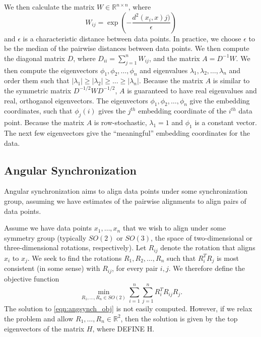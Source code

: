 \documentclass[10pt]{article}
\begin{document}
We then calculate the matrix $W \in \mathbb{R}^{n \times n}$, where 
\begin{equation}
W_{ij} = \exp \left( -\frac{d^2(x_i, x)j)}{\epsilon} \right)
\end{equation}
and $\epsilon$ is a characteristic distance between data points.
%
In practice, we choose $\epsilon$ to be the median of the pairwise distances between data points.
%
We then compute the diagonal matrix $D$, where $D_{ii} = \sum_{j=1}^{n} W_{ij}$, and the matrix $A = D^{-1} W$. 
%
We then compute the eigenvectors $\phi_1, \phi_2, \dots, \phi_n$ and eigenvalues $\lambda_1, \lambda_2, \dots, \lambda_n$ and order them such that $|\lambda_1| \ge |\lambda_2| \ge \dots \ge |\lambda_n|$. 
%
Because the matrix $A$ is similar to the symmetric matrix $D^{-1/2} W D^{-1/2}$, $A$ is guaranteed to have real eigenvalues and real, orthoganol eigenvectors. 
%
The eigenvectors $\phi_1, \phi_2, \dots, \phi_n$ give the embedding coordinates, such that $\phi_j(i)$ gives the $j^{th}$ embedding coordinate of the $i^{th}$ data point. 
%
Because the matrix $A$ is row-stochastic, $\lambda_1=1$ and $\phi_1$ is a constant vector.
%
The next few eigenvectors give the ``meaningful'' embedding coordinates for the data. 

\subsection*{Angular Synchronization}

Angular synchronization aims to align data points under some synchronization group, assuming we have estimates of the pairwise alignments to align pairs of data points. 

Assume we have data points $x_1, \dots, x_n$ that we wish to align under some symmetry group (typically $SO(2)$ or $SO(3)$, the space of two-dimensional or three-dimensional rotations, respectively).
%
Let $R_{ij}$ denote the rotation that aligns $x_i$ to $x_j$. 
%
We seek to find the rotations $R_1, R_2, \dots, R_n$ such that $R_i^T R_j$ is most consistent (in some sense) with $R_{ij}$, for every pair $i, j$. 
%
We therefore define the objective function 
\begin{equation} \label{eqn:angsynch_obj}
\min_{R_1, \dots, R_n \in SO(2)} \sum_{i=1}^{n} \sum_{j=1}^{n} R_i^T R_{ij} R_j.
\end{equation}
%
The solution to \eqref{eqn:angsynch_obj} is not easily computed.
%
However, if we relax the problem and allow $R_1, \dots, R_n \in \mathbb{R}^2$, then the solution is given by the top eigenvectors of the matrix $H$, where DEFINE H. 
\end{document}
